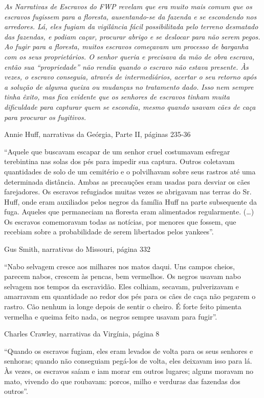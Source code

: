\emph{As Narrativas de Escravos do FWP revelam que era muito mais comum
que os escravos fugissem para a floresta, ausentando-se da fazenda e se
escondendo nos arredores. Lá, eles fugiam da vigilância fácil
possibilitada pelo terreno desmatado das fazendas, e podiam caçar,
procurar abrigo e se deslocar para não serem pegos. Ao fugir para a
floresta, muitos escravos começavam um processo de barganha com os seus
proprietários. O senhor queria e precisava da mão de obra escrava, então
sua ``propriedade'' não rendia quando o escravo não estava presente. Às
vezes, o escravo conseguia, através de intermediários, acertar o seu
retorno após a solução de alguma queixa ou mudanças no tratamento dado.
Isso nem sempre tinha êxito, mas fica evidente que os senhores de
escravos tinham muita dificuldade para capturar quem se escondia, mesmo
quando usavam cães de caça para procurar os fugitivos.}

Annie Huff, narrativas da Geórgia, Parte II, páginas 235-36

``Aquele que buscavam escapar de um senhor cruel costumavam esfregar
terebintina nas solas dos pés para impedir sua captura. Outros coletavam
quantidades de solo de um cemitério e o polvilhavam sobre seus rastros
até uma determinada distância. Ambas as precauções eram usadas para
desviar os cães farejadores. Os escravos refugiados muitas vezes se
abrigavam nas terras do Sr. Huff, onde eram auxiliados pelos negros da
família Huff na parte subsequente da fuga. Aqueles que permaneciam na
floresta eram alimentados regularmente. (\ldots{}) Os escravos
comemoravam todas as notícias, por menores que fossem, que recebiam
sobre a probabilidade de serem libertados pelos yankees''.

Gus Smith, narrativas do Missouri, página 332

``Nabo selvagem cresce aos milhares nos matos daqui. Uns campos cheios,
parecem nabos, crescem às pencas, bem vermelhos. Os negros usavam nabo
selvagem nos tempos da escravidão. Eles colhiam, secavam, pulverizavam e
amarravam em quantidade ao redor dos pés para os cães de caça não
pegarem o rastro. Cão nenhum ia longe depois de sentir o cheiro. É forte
feito pimenta vermelha e queima feito nada, os negros sempre usavam para
fugir''.

Charles Crawley, narrativas da Virgínia, página 8

``Quando os escravos fugiam, eles eram levados de volta para os seus
senhores e senhoras; quando não conseguiam pegá-los de volta, eles
deixavam isso para lá. Às vezes, os escravos saíam e iam morar em outros
lugares; alguns moravam no mato, vivendo do que roubavam: porcos, milho
e verduras das fazendas dos outros''.


